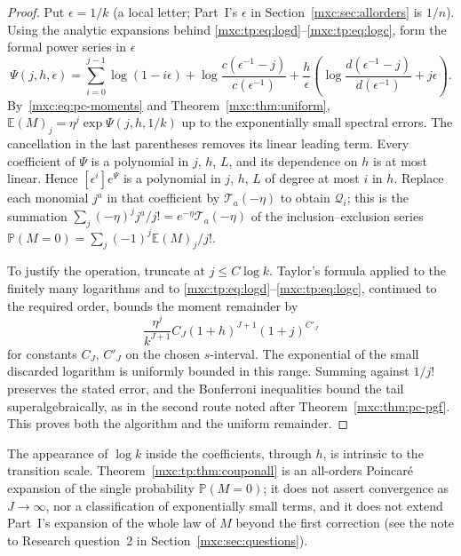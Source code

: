 \documentclass[11pt]{article}
\numberwithin{equation}{section}
\theoremstyle{definition}
\theoremstyle{remark}
\newcommand{\E}{\mathbb E}
\newcommand{\Pp}{\mathbb P}
\begin{document}
\begin{proof}
Put $\epsilon=1/k$ (a local letter; Part~I's $\epsilon$ in
Section~\ref{mxc:sec:allorders} is $1/n$). Using the analytic expansions
behind \eqref{mxc:tp:eq:logd}--\eqref{mxc:tp:eq:logc}, form the formal power
series in $\epsilon$
\begin{equation}\label{mxc:tp:eq:couponalgorithm}
 \Psi(j,h,\epsilon)=\sum_{i=0}^{j-1}\log(1-i\epsilon)
 +\log\frac{c(\epsilon^{-1}-j)}{c(\epsilon^{-1})}
 +\frac h\epsilon\left(\log\frac{d(\epsilon^{-1}-j)}{d(\epsilon^{-1})}
                 +j\epsilon\right).
\end{equation}
By~\eqref{mxc:eq:pc-moments} and Theorem~\ref{mxc:thm:uniform},
$\E(M)_j=\eta^j\exp\Psi(j,h,1/k)$ up to the exponentially small spectral
errors. The cancellation in the last parentheses removes its linear
leading term. Every coefficient of $\Psi$ is a polynomial in $j$, $h$,
$L$, and its dependence on $h$ is at most linear. Hence
$[\epsilon^i]e^\Psi$ is a polynomial in $j$, $h$, $L$ of degree at most
$i$ in $h$. Replace each monomial $j^a$ in that coefficient by
$\mathcal T_a(-\eta)$ to obtain $\mathcal Q_i$; this is the summation
$\sum_j(-\eta)^jj^a/j!=e^{-\eta}\mathcal T_a(-\eta)$ of the
inclusion--exclusion series $\Pp(M=0)=\sum_j(-1)^j\E(M)_j/j!$.

To justify the operation, truncate at $j\le C\log k$. Taylor's formula
applied to the finitely many logarithms and to
\eqref{mxc:tp:eq:logd}--\eqref{mxc:tp:eq:logc}, continued to the required
order, bounds the moment remainder by
\[
 \frac{\eta^j}{k^{J+1}}C_J(1+h)^{J+1}(1+j)^{C'_J}
\]
for constants $C_J$, $C'_J$ on the chosen $s$-interval. The exponential of
the small discarded logarithm is uniformly bounded in this range. Summing
against $1/j!$ preserves the stated error, and the Bonferroni
inequalities bound the tail superalgebraically, as in the second route
noted after Theorem~\ref{mxc:thm:pc-pgf}. This proves both the algorithm and
the uniform remainder.
\end{proof}

The appearance of $\log k$ inside the coefficients, through $h$, is
intrinsic to the transition scale. Theorem~\ref{mxc:tp:thm:couponall} is an
all-orders Poincar\'e expansion of the single probability $\Pp(M=0)$; it
does not assert convergence as $J\to\infty$, nor a classification of
exponentially small terms, and it does not extend Part~I's expansion of
the whole law of $M$ beyond the first correction (see the note to
Research question~2 in Section~\ref{mxc:sec:questions}).
\end{document}
